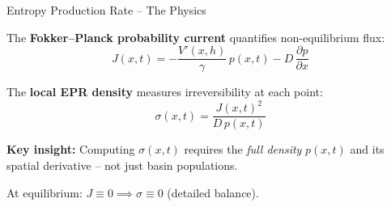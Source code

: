 \documentclass[aspectratio=169,11pt]{beamer}
\newcommand{\emphbox}[1]{\colorbox{blue!8}{\parbox{0.92\textwidth}{#1}}}
\begin{document}

\begin{frame}{Entropy Production Rate -- The Physics}

The \textbf{Fokker--Planck probability current} quantifies non-equilibrium flux:
\begin{equation*}
    J(x,t) = -\frac{V'(x,h)}{\gamma}\,p(x,t) - D\,\frac{\partial p}{\partial x}
\end{equation*}

The \textbf{local EPR density} measures irreversibility at each point:
\begin{equation*}
    \sigma(x,t) = \frac{J(x,t)^2}{D\,p(x,t)}
\end{equation*}

\smallskip
\emphbox{
\textbf{Key insight:} Computing $\sigma(x,t)$ requires the \textit{full density} $p(x,t)$ and its spatial derivative -- not just basin populations.
}

\smallskip
At equilibrium: $J \equiv 0 \implies \sigma \equiv 0$ (detailed balance).

\end{frame}

\end{document}
